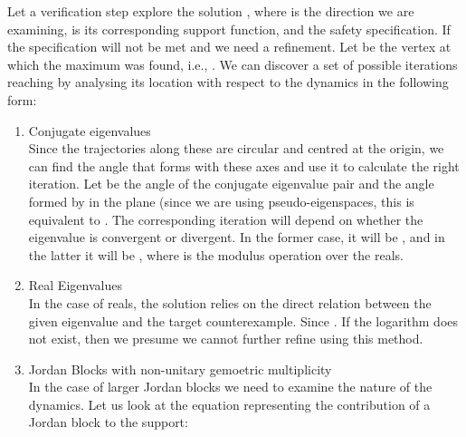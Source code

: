 \documentclass{IEEEtran}
\begin{document}
{Let a verification step explore the solution , where 
 is the direction we are examining,  is its corresponding support function, and 
the safety specification. If  the specification will not be met and we need a refinement.
Let  be the vertex at which the maximum was found, i.e., .
We can discover a set of possible iterations reaching  by analysing its location with respect to
the dynamics in the following form:
\begin{enumerate}
\item Conjugate eigenvalues\\
Since the trajectories along these are circular and centred at the origin, we 
can find the angle that  forms with these axes and use it to calculate the right iteration. Let 
 be the angle of the conjugate eigenvalue pair and  the angle formed
by  in the  plane (since we are using pseudo-eigenspaces, this is equivalent to 
. 
The corresponding iteration will depend on whether the eigenvalue is convergent or divergent. In the former
case, it will be , and in the latter it will be ,
where  is the modulus operation over the reals.
\item Real Eigenvalues\\
In the case of reals, the solution relies on the direct relation between the given
eigenvalue and the target counterexample. Since . 
If the logarithm does not exist, then we presume we cannot further refine using this method.
\item Jordan Blocks with non-unitary gemoetric multiplicity\\
In the case of larger Jordan blocks we need to examine the nature of the dynamics. Let us look at the equation representing the contribution of a Jordan block to the support:


\end{enumerate}}
\end{document}
